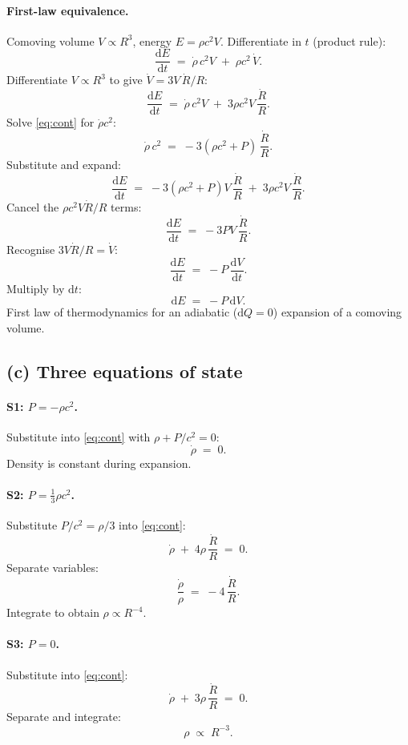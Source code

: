 \documentclass[11pt]{article}
\newcommand{\de}{\mathrm{d}}
\begin{document}
\paragraph{First-law equivalence.}
Comoving volume $V\propto R^3$, energy $E=\rho c^2 V$. Differentiate in $t$ (product rule):
\[
\frac{\de E}{\de t} \;=\; \dot\rho\,c^2 V \;+\; \rho c^2\,\dot V.
\]
Differentiate $V\propto R^3$ to give $\dot V = 3 V\,\dot R/R$:
\[
\frac{\de E}{\de t} \;=\; \dot\rho\,c^2 V \;+\; 3\rho c^2 V\,\frac{\dot R}{R}.
\]
Solve \eqref{eq:cont} for $\dot\rho c^2$:
\[
\dot\rho\,c^2 \;=\; -3(\rho c^2 + P)\,\frac{\dot R}{R}.
\]
Substitute and expand:
\[
\frac{\de E}{\de t} \;=\; -3(\rho c^2 + P)V\,\frac{\dot R}{R} \;+\; 3\rho c^2 V\,\frac{\dot R}{R}.
\]
Cancel the $\rho c^2 V \dot R/R$ terms:
\[
\frac{\de E}{\de t} \;=\; -3 P V\,\frac{\dot R}{R}.
\]
Recognise $3 V\dot R/R = \dot V$:
\[
\frac{\de E}{\de t} \;=\; -P\,\frac{\de V}{\de t}.
\]
Multiply by $\de t$:
\begin{equation}
\boxed{\;\de E \;=\; -P\,\de V.\;}
\label{eq:firstlaw}
\end{equation}
First law of thermodynamics for an adiabatic ($\de Q=0$) expansion of a comoving volume.

\subsection*{(c) Three equations of state}

\paragraph{S1: $P=-\rho c^2$.}
Substitute into \eqref{eq:cont} with $\rho+P/c^2=0$:
\[
\dot\rho \;=\; 0.
\]
Density is constant during expansion. 

\paragraph{S2: $P=\tfrac{1}{3}\rho c^2$.}
Substitute $P/c^2=\rho/3$ into \eqref{eq:cont}:
\[
\dot\rho \;+\; 4\rho\,\frac{\dot R}{R} \;=\; 0.
\]
Separate variables:
\[
\frac{\dot\rho}{\rho} \;=\; -4\,\frac{\dot R}{R}.
\]
Integrate to obtain $\rho\propto R^{-4}$. 

\paragraph{S3: $P=0$.}
Substitute into \eqref{eq:cont}:
\[
\dot\rho \;+\; 3\rho\,\frac{\dot R}{R} \;=\; 0.
\]
Separate and integrate:
\[
\rho\;\propto\;R^{-3}.
\]
\end{document}

